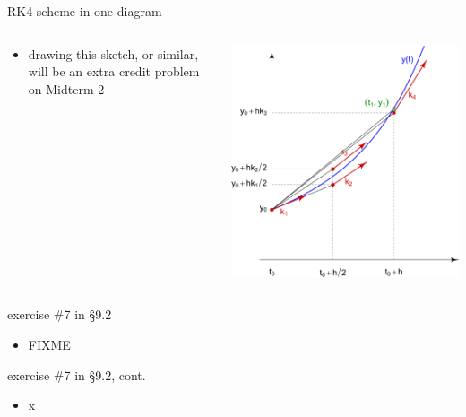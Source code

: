 \documentclass[urlcolor=blue,dvipsnames]{beamer}
\begin{document}
\begin{frame}{RK4 scheme in one diagram}

\begin{columns}
\begin{column}{0.35\textwidth}
\small
\begin{itemize}
\item drawing this sketch, or similar, will be an extra credit problem on Midterm 2
\end{itemize}
\end{column}
\begin{column}{0.65\textwidth}
\hfill \includegraphics[width=\textwidth]{figs/rk4diagram}
\end{column}
\end{columns}
\end{frame}


\begin{frame}{exercise \#7 in \S9.2}

\begin{itemize}
\item FIXME
\end{itemize}
\end{frame}


\begin{frame}{exercise \#7 in \S9.2, cont.}

\begin{itemize}
\item x
\end{itemize}
\end{frame}
\end{document}
